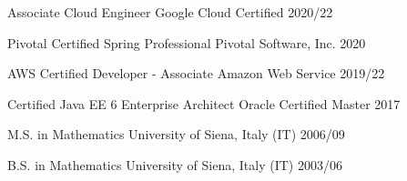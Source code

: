 

\begin{cvhonors}

  \cvhonor
    {Associate Cloud Engineer} %
    {Google Cloud Certified} %
    {} %
    {2020/22} %

  \cvhonor
    {Pivotal Certified Spring Professional} %
    {Pivotal Software, Inc.} %
    {} %
    {2020} %

  \cvhonor
    {AWS Certified Developer - Associate} %
    {Amazon Web Service} %
    {} %
    {2019/22} %

  \cvhonor
    {Certified Java EE 6 Enterprise Architect} %
    {Oracle Certified Master} %
    {} %
    {2017} %

  \cvhonor
    {M.S. in Mathematics} %
    {University of Siena, Italy (IT)} %
    {} %
    {2006/09} %

  \cvhonor
    {B.S. in Mathematics} %
    {University of Siena, Italy (IT)} %
    {} %
    {2003/06} %

\end{cvhonors}